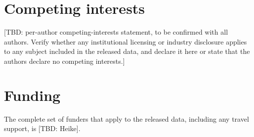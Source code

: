 \documentclass[pdflatex,sn-nature]{sn-jnl}%
\begin{document}

\section*{Competing interests}\label{sec:coi}
[TBD: per-author competing-interests statement, to be confirmed with all authors. Verify whether any institutional licensing or industry disclosure applies to any subject included in the released data, and declare it here or state that the authors declare no competing interests.]


\section*{Funding}\label{sec:funding}
The complete set of funders that apply to the released data, including any travel support, is [TBD: Heike].
\end{document}
